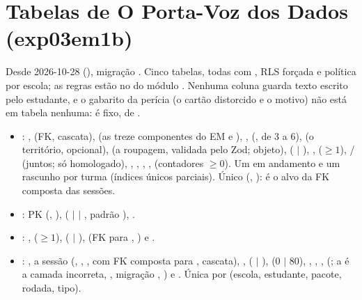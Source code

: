 \section{Tabelas de O Porta-Voz dos Dados (exp03em1b)}
\label{sec:dicionario-exp03em1b}

Desde 2026-10-28 (), migração
. Cinco tabelas,
todas com  , RLS forçada e política por escola; as
regras estão no  do módulo .
Nenhuma coluna guarda texto escrito pelo estudante, e o gabarito da perícia
(o cartão distorcido e o motivo) não está em tabela nenhuma: é fixo, de
.

\begin{itemize}
  \item {}: ,  (FK, cascata),
     (as treze componentes do EM e ),
    ,  (, de 3 a 6),  (o
    território, opcional),  (a roupagem, validada pelo Zod;
    objeto),  ( $|$ ), ,
     ($\geq 1$), /
    (juntos;  só homologado), ,
    , , ,
     (contadores $\geq 0$). Um em andamento e um rascunho
    por turma (índices únicos parciais). Único (, ): é
    o alvo da FK composta das sessões.
  \item {}: PK (, ),
     ( $|$  $|$ , padrão
    ), .
  \item {}: , 
    ($\geq 1$),  ( $|$ ), 
    (FK para , ) e .
  \item {}: , a sessão
    (, , , com FK composta para
    , cascata), , 
    ( $|$ ),  (0 $|$ 80), ,
    , ,  (; a 
    é a camada incorreta, , migração
    , ) e . Única por
    (escola, estudante, pacote, rodada, tipo).
\end{itemize}

